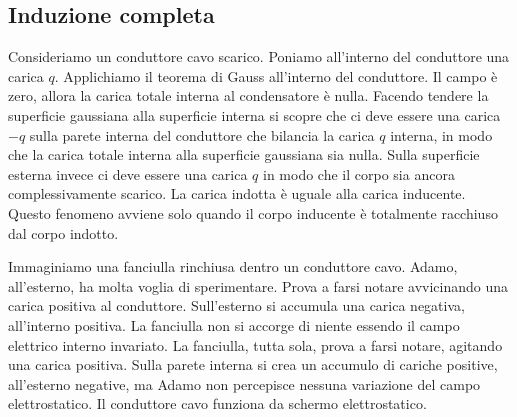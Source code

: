 \subsection{Induzione completa}
Consideriamo un conduttore cavo scarico. Poniamo all'interno del conduttore una carica $q$. Applichiamo il teorema di Gauss all'interno del conduttore. Il campo è zero, allora la carica totale interna al condensatore è nulla. Facendo tendere la superficie gaussiana alla superficie interna si scopre che ci deve essere una carica $-q$ sulla parete interna del conduttore che bilancia la carica $q$ interna, in modo che la carica totale interna alla superficie gaussiana sia nulla. Sulla superficie esterna invece ci deve essere una carica $q$ in modo che il corpo sia ancora complessivamente scarico. La carica indotta è uguale alla carica inducente. Questo fenomeno avviene solo quando il corpo inducente è totalmente racchiuso dal corpo indotto.
\begin{Es}
Im\-ma\-gi\-nia\-mo una fanciulla rinchiusa dentro un conduttore cavo. Adamo, all'esterno, ha molta voglia di sperimentare. Prova a farsi notare avvicinando una carica positiva al conduttore. Sull'esterno si accumula una carica negativa, all'interno positiva. La fanciulla non si accorge di niente essendo il campo elettrico interno invariato. La fanciulla, tutta sola, prova a farsi notare, agitando una carica positiva. Sulla parete interna si crea un accumulo di cariche positive, all'esterno negative, ma Adamo non percepisce nessuna variazione del campo elettrostatico. Il conduttore cavo funziona da schermo elettrostatico.
\end{Es}
